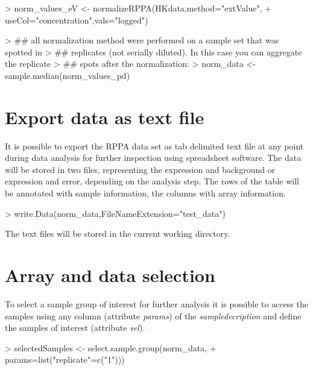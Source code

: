 \documentclass[12pt]{article}
\newcommand{\Rfunarg}[1]{{\textit{#1}}}
\begin{document}
\begin{Schunk}
\begin{Sinput}
> norm_values_eV <- normalizeRPPA(HKdata,method="extValue",
+                              useCol="concentration",vals="logged")
\end{Sinput}
\end{Schunk}

\begin{Schunk}
\begin{Sinput}
> ## all normalization method were performed on a sample set that was spotted in
> ## replicates (not serially diluted). In this case you can aggregate the replicate
> ## spots after the normalization:
> norm_data <- sample.median(norm_values_pd)
\end{Sinput}
\end{Schunk}

\section{Export data as text file}
   
It is possible to export the RPPA data set as tab delimited text file at any point 
during data analysis for further inspection using spreadsheet software. The data will 
be stored in two files, representing the expression and background or expression and 
error, depending on the analysis step. The rows of the table will be annotated with sample
information, the columns with array information.

\begin{Schunk}
\begin{Sinput}
> write.Data(norm_data,FileNameExtension="test_data")
\end{Sinput}
\end{Schunk}

The text files will be stored in the current working directory.

\section{Array and data selection}

To select a sample group of interest for further analysis it is possible to access 
the samples using any column (attribute \Rfunarg{params}) of the \emph{sampledecription} and define
the samples of interest (attribute \Rfunarg{sel}).

\begin{Schunk}
\begin{Sinput}
> selectedSamples  <-  select.sample.group(norm_data,
+                      params=list("replicate"=c("1")))
\end{Sinput}
\end{Schunk}
\end{document}
